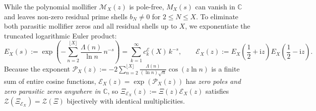 \documentclass[11pt,reqno]{amsart}
\theoremstyle{definition}
\theoremstyle{remark}
\numberwithin{equation}{section}
\newcommand{\C}{\mathbb{C}}
\newcommand{\ii}{\mathrm{i}}
\begin{document}
While the polynomial mollifier $\mathcal{M}_X(z)$ is pole-free, $M_X(s)$ can vanish in $\C$ and leaves non-zero residual prime shells $b_N \neq 0$ for $2 \le N \le X$. To eliminate both parasitic mollifier zeros and all residual shells up to $X$, we exponentiate the truncated logarithmic Euler product:
\begin{equation}\label{eq:EX_def}
E_X(s) := \exp\!\left(-\sum_{n=2}^{\lfloor X\rfloor} \frac{\Lambda(n)}{\ln n}\,n^{-s}\right) = \sum_{k=1}^{\infty} c_k^{\mathcal{E}}(X)\,k^{-s}, \qquad \mathcal{E}_X(z) := E_X\!\left(\frac{1}{2} + \ii z\right)E_X\!\left(\frac{1}{2} - \ii z\right).
\end{equation}
Because the exponent $\mathcal{P}_X(z) := -2\sum_{n=2}^{\lfloor X\rfloor} \frac{\Lambda(n)}{(\ln n)\sqrt{n}}\cos(z\ln n)$ is a finite sum of entire cosine functions, $\mathcal{E}_X(z) = \exp(\mathcal{P}_X(z))$ has \emph{zero poles and zero parasitic zeros anywhere in $\C$}, so $\Xi_{\mathcal{E}_X}(z) := \Xi(z)\mathcal{E}_X(z)$ satisfies $\mathcal{Z}(\Xi_{\mathcal{E}_X}) = \mathcal{Z}(\Xi)$ bijectively with identical multiplicities.
\end{document}
